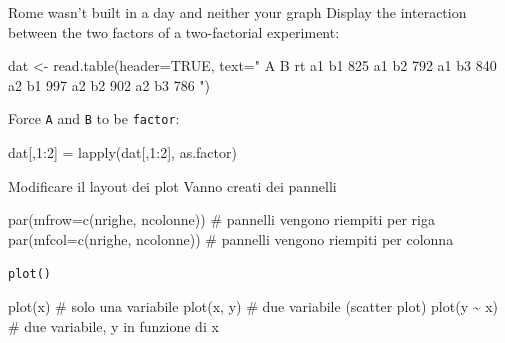 \documentclass[
  ignorenonframetext,
]{beamer}
\newenvironment{Shaded}{\begin{snugshade}}{\end{snugshade}}
\newcommand{\AttributeTok}[1]{\textcolor[rgb]{0.00,0.34,0.68}{#1}}
\newcommand{\CommentTok}[1]{\textcolor[rgb]{0.54,0.53,0.53}{#1}}
\newcommand{\ConstantTok}[1]{\textcolor[rgb]{0.67,0.33,0.00}{#1}}
\newcommand{\DecValTok}[1]{\textcolor[rgb]{0.69,0.50,0.00}{#1}}
\newcommand{\FunctionTok}[1]{\textcolor[rgb]{0.39,0.29,0.61}{#1}}
\newcommand{\NormalTok}[1]{\textcolor[rgb]{0.12,0.11,0.11}{#1}}
\newcommand{\OtherTok}[1]{\textcolor[rgb]{0.00,0.43,0.16}{#1}}
\newcommand{\SpecialCharTok}[1]{\textcolor[rgb]{0.24,0.68,0.91}{#1}}
\newcommand{\StringTok}[1]{\textcolor[rgb]{0.75,0.01,0.01}{#1}}
\begin{document}
\begin{frame}[fragile]{Rome wasn't built in a day \small and neither
your graph}
\protect\hypertarget{rome-wasnt-built-in-a-day-and-neither-your-graph}{}
Display the interaction between the two factors of a two-factorial
experiment:

\begin{Shaded}
\begin{Highlighting}[]
\NormalTok{dat }\OtherTok{\textless{}{-}} \FunctionTok{read.table}\NormalTok{(}\AttributeTok{header=}\ConstantTok{TRUE}\NormalTok{, }\AttributeTok{text=}\StringTok{"}
\StringTok{A B rt}
\StringTok{a1 b1 825}
\StringTok{a1 b2 792}
\StringTok{a1 b3 840}
\StringTok{a2 b1 997}
\StringTok{a2 b2 902}
\StringTok{a2 b3 786}
\StringTok{"}\NormalTok{)}
\end{Highlighting}
\end{Shaded}

Force \texttt{A} and \texttt{B} to be \texttt{factor}:

\begin{Shaded}
\begin{Highlighting}[]
\NormalTok{dat[,}\DecValTok{1}\SpecialCharTok{:}\DecValTok{2}\NormalTok{] }\OtherTok{=} \FunctionTok{lapply}\NormalTok{(dat[,}\DecValTok{1}\SpecialCharTok{:}\DecValTok{2}\NormalTok{], as.factor)}
\end{Highlighting}
\end{Shaded}
\end{frame}

\begin{frame}[fragile]{Modificare il layout dei plot}
\protect\hypertarget{modificare-il-layout-dei-plot}{}
Vanno creati dei pannelli

\small

\begin{Shaded}
\begin{Highlighting}[]
\FunctionTok{par}\NormalTok{(}\AttributeTok{mfrow=}\FunctionTok{c}\NormalTok{(nrighe, ncolonne)) }\CommentTok{\# pannelli vengono riempiti per riga}
\FunctionTok{par}\NormalTok{(}\AttributeTok{mfcol=}\FunctionTok{c}\NormalTok{(nrighe, ncolonne)) }\CommentTok{\# pannelli vengono riempiti per colonna }
\end{Highlighting}
\end{Shaded}
\end{frame}

\begin{frame}[fragile]{\texttt{plot()}}
\protect\hypertarget{plot}{}
\begin{Shaded}
\begin{Highlighting}[]
\FunctionTok{plot}\NormalTok{(x) }\CommentTok{\# solo una variabile}
\FunctionTok{plot}\NormalTok{(x, y) }\CommentTok{\# due variabile (scatter plot)}
\FunctionTok{plot}\NormalTok{(y }\SpecialCharTok{\textasciitilde{}}\NormalTok{ x) }\CommentTok{\# due variabile, y in funzione di x}
\end{Highlighting}
\end{Shaded}
\end{frame}
\end{document}
